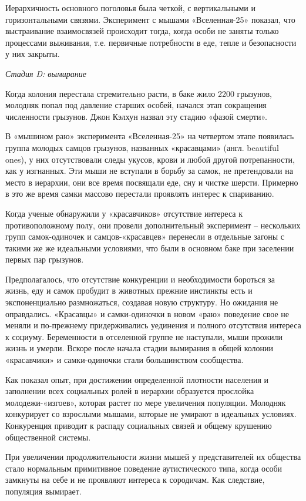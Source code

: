 Иерархичность основного поголовья была четкой, с вертикальными и горизонтальными связями. Эксперимент с мышами «Вселенная-25» показал, что выстраивание взаимосвязей происходит тогда, когда особи не заняты только процессами выживания, т.е. первичные потребности в еде, тепле и безопасности у них закрыты.

\textit{Стадия D: вымирание}

Когда колония перестала стремительно расти, в баке жило 2200 грызунов, молодняк попал под давление старших особей, начался этап сокращения численности грызунов. Джон  Кэлхун назвал эту стадию «фазой смерти».

В «мышином раю» эксперимента «Вселенная-25» на четвертом этапе появилась группа молодых самцов грызунов, названных «красавцами» (англ. beautiful ones), у них отсутствовали следы укусов, крови и любой другой потрепанности, как у изгнанных. Эти мыши не вступали в борьбу за самок, не претендовали на место в иерархии, они все время посвящали еде, сну и чистке шерсти. Примерно в это же время самки массово перестали проявлять интерес к спариванию.

Когда ученые обнаружили у «красавчиков» отсутствие интереса к противоположному полу, они провели дополнительный эксперимент – нескольких групп самок-одиночек и самцов-«красавцев» перенесли в отдельные загоны с такими же же идеальными условиями, что были в основном баке при заселении первых пар грызунов.

Предполагалось, что отсутствие конкуренции и необходимости бороться за жизнь, еду и самок пробудит в животных прежние инстинкты есть и экспоненциально размножаться, создавая новую структуру. Но ожидания не оправдались. «Красавцы» и самки-одиночки в новом «раю» поведение свое не меняли и по-прежнему придерживались уединения и полного отсутствия интереса к социуму. Беременности в отселенной группе не наступали, мыши прожили жизнь и умерли. Вскоре после начала стадии вымирания в общей колонии «красавчики» и самки-одиночки стали большинством сообщества.

Как показал опыт, при достижении определенной плотности населения и заполнении всех социальных ролей в иерархии образуется прослойка молодежи-«изгоев», которая растет по мере увеличения популяции. Молодняк конкурирует со взрослыми мышами, которые не умирают в идеальных условиях. Конкуренция приводит к распаду социальных связей и общему крушению общественной системы.

При увеличении продолжительности жизни мышей у представителей их общества стало нормальным примитивное поведение аутистического типа, когда особи замкнуты на себе и не проявляют интереса к сородичам. Как следствие, популяция вымирает.

